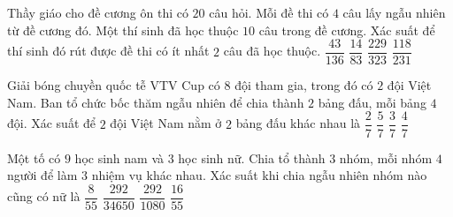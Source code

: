 \begin{ex}%
Thầy giáo cho đề cương ôn thi có $20$ câu hỏi. Mỗi đề thi có $4$ câu lấy ngẫu nhiên từ đề cương đó. Một thí sinh đã học thuộc $10$ câu trong đề cương. Xác suất để thí sinh đó rút được đề thi có ít nhất $2$ câu đã học thuộc.
\choice
{$\dfrac{43}{136}$}
{$\dfrac{14}{83}$}
{\True $\dfrac{229}{323}$}
{$\dfrac{118}{231}$}
\end{ex}

\begin{ex}%
Giải bóng chuyền quốc tễ VTV Cup có $8$ đội tham gia, trong đó có $2$ đội Việt Nam. Ban tổ chức bốc thăm ngẫu nhiên để chia thành $2$ bảng đấu, mỗi bảng $4$ đội. Xác suất để $2$ đội Việt Nam nằm ở $2$ bảng đấu khác nhau là
\choice
{\True $\dfrac{2}{7}$}
{$\dfrac{5}{7}$}
{$\dfrac{3}{7}$}
{$\dfrac{4}{7}$}
\end{ex}

\begin{ex}%
Một tố có $9$ học sinh nam và $3$ học sinh nữ. Chia tổ thành $3$ nhóm, mỗi nhóm $4$ người để làm $3$ nhiệm vụ khác nhau. Xác suất khi chia ngẫu nhiên nhóm nào cũng có nữ là
\choice
{$\dfrac{8}{55}$}
{$\dfrac{292}{34650}$}
{$\dfrac{292}{1080}$}
{\True $\dfrac{16}{55}$}
\end{ex}

